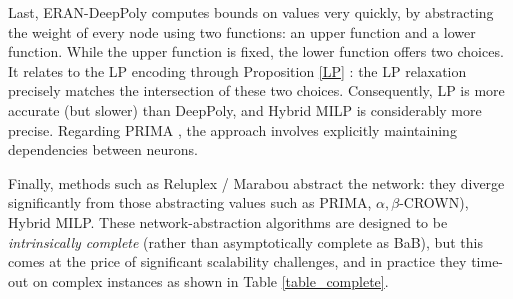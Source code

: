 Last, ERAN-DeepPoly \cite{deeppoly} computes bounds on values very quickly, by abstracting the weight of every node using two functions: an upper function and a lower function. While the upper function is fixed, the lower function offers two choices.
It relates to the LP encoding through Proposition \ref{LP} \cite{alessandro}: the LP relaxation precisely matches the intersection of these two choices. Consequently, LP is more accurate (but slower) than DeepPoly, and Hybrid MILP is considerably more precise. Regarding PRIMA \cite{prima}, the approach involves explicitly maintaining dependencies between neurons.




Finally, methods such as Reluplex / Marabou \cite{Reluplex,Marabou}  abstract the network: they diverge significantly from those abstracting values such as PRIMA, $\alpha,\beta$-CROWN)\cite{prima,crown}, Hybrid MILP. These network-abstraction algorithms are designed to be {\em intrinsically complete} (rather than asymptotically complete as BaB), but this comes at the price of significant scalability challenges, and in practice they time-out on complex instances as shown in Table \ref{table_complete}.